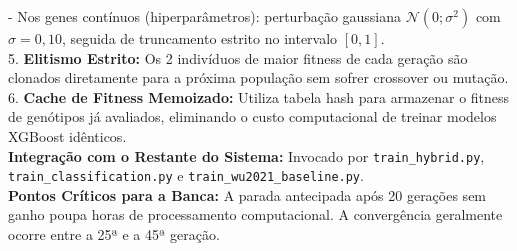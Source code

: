 \documentclass[10pt,a4paper]{article}
\begin{document}
\begin{filebox}
   - Nos genes contínuos (hiperparâmetros): perturbação gaussiana $\mathcal{N}(0; \sigma^2)$ com $\sigma = 0,10$, seguida de truncamento estrito no intervalo $[0, 1]$.\\
5. \textbf{Elitismo Estrito:} Os 2 indivíduos de maior fitness de cada geração são clonados diretamente para a próxima população sem sofrer crossover ou mutação.\\
6. \textbf{Cache de Fitness Memoizado:} Utiliza tabela hash para armazenar o fitness de genótipos já avaliados, eliminando o custo computacional de treinar modelos XGBoost idênticos.\\
\textbf{Integração com o Restante do Sistema:} Invocado por \texttt{train\_hybrid.py}, \texttt{train\_classification.py} e \texttt{train\_wu2021\_baseline.py}.\\
\textbf{Pontos Críticos para a Banca:} A parada antecipada após 20 gerações sem ganho poupa horas de processamento computacional. A convergência geralmente ocorre entre a 25ª e a 45ª geração.
\end{filebox}
\end{document}
